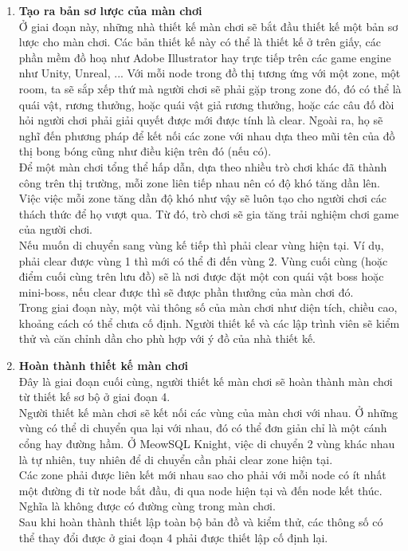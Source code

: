 \begin{enumerate}
	\item \textbf{Tạo ra bản sơ lược của màn chơi}\\
	\hspace*{1cm}  Ở giai đoạn này, những nhà thiết kế màn chơi sẽ bắt đầu thiết kế một bản sơ lược cho màn chơi. Các bản thiết kế này có thể là thiết kế ở trên giấy, các phần mềm đồ hoạ như Adobe Illustrator hay
	trực tiếp trên các game engine như Unity, Unreal, ... Với mỗi node trong đồ thị tương ứng với một zone, một room, ta sẽ sắp xếp thứ mà người chơi sẽ phải gặp trong zone đó, đó có thể là quái vật, rương thưởng, hoặc quái vật giả rương thưởng, hoặc các câu đố đòi hỏi người chơi phải giải quyết được mới được tính là clear.  Ngoài ra, họ sẽ nghĩ đến phương pháp để kết nối các zone với nhau dựa theo mũi tên của đồ thị bong bóng cũng như điều kiện trên đó (nếu có).\\
	\hspace*{1cm} Để một màn chơi tổng thể hấp dẫn, dựa theo nhiều trò chơi khác đã thành công trên thị trường, mỗi zone liên tiếp nhau nên có độ khó tăng dần lên. Việc việc mỗi zone tăng dần độ khó như vậy sẽ luôn tạo cho người chơi các thách thức để họ vượt qua. Từ đó, trò chơi sẽ gia tăng trải nghiệm chơi game của người chơi.\\
	\hspace*{1cm} Nếu muốn di chuyển sang vùng kế tiếp thì phải clear vùng hiện tại. Ví dụ, phải clear được vùng 1 thì mới có thể đi đến vùng 2.  Vùng cuối cùng (hoặc điểm cuối cùng trên lưu đồ) sẽ là nơi được đặt một con quái vật boss hoặc mini-boss, nếu clear được thì sẽ được phần thưởng của màn chơi đó.\\
	\hspace*{1cm} Trong giai đoạn này, một vài thông số của màn chơi như diện tích, chiều cao, khoảng cách có thể chưa cố định. Người thiết kế và các lập trình viên sẽ kiểm thử và căn chỉnh dần cho phù hợp với ý đồ của nhà thiết kế.\\
	\item \textbf{Hoàn thành thiết kế màn chơi}\\
	\hspace*{1cm} Đây là giai đoạn cuối cùng, người thiết kế màn chơi sẽ hoàn thành màn chơi từ thiết kế sơ bộ ở giai đoạn 4.\\
	\hspace*{1cm} Người thiết kế màn chơi sẽ kết nối các vùng của màn chơi với nhau. Ở những vùng có thể di chuyển qua lại với nhau, đó có thể đơn giản chỉ là một cánh cổng hay đường hầm. Ở MeowSQL Knight, việc di chuyển 2 vùng khác nhau là tự nhiên, tuy nhiên để di chuyển cần phải clear zone hiện tại.\\
	\hspace*{1cm} Các zone phải được liên kết mới nhau sao cho phải với mỗi node có ít nhất một đường đi từ node bắt đầu, đi qua node hiện tại và đến node kết thúc. Nghĩa là không được có đường cùng trong màn chơi.\\
	\hspace*{1cm} Sau khi hoàn thành thiết lập toàn bộ bản đồ và kiểm thử, các thông số có thể thay đổi được ở giai đoạn 4 phải được thiết lập cố định lại.
\end{enumerate}
